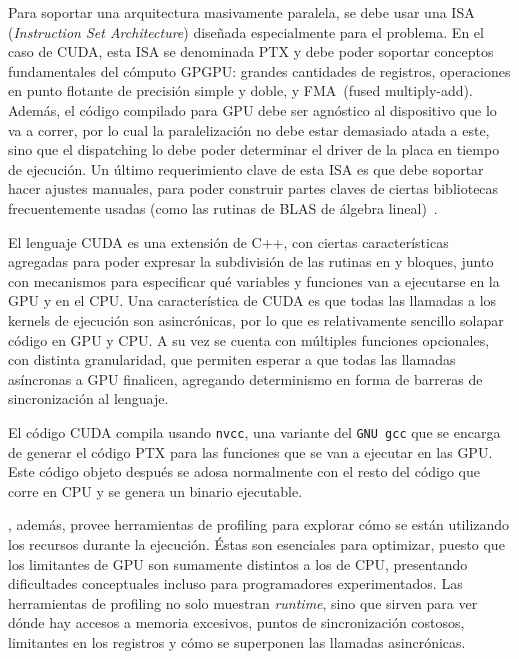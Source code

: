 Para soportar una arquitectura masivamente paralela, se debe usar una ISA (\textit{Instruction Set Architecture}) dise\~nada especialmente para el problema.
En el caso de CUDA, esta ISA se denominada PTX y debe poder soportar conceptos fundamentales del c\'omputo GPGPU: grandes cantidades de registros, operaciones en punto flotante de precisi\'on simple y doble, y FMA~(fused multiply-add).
Adem\'as, el c\'odigo compilado para GPU debe ser agn\'ostico al dispositivo que lo va a correr, por lo cual la paralelizaci\'on no debe estar demasiado atada a este, sino que el dispatching lo debe poder determinar el driver de la placa en tiempo de ejecuci\'on.
Un \'ultimo requerimiento clave de esta ISA es que debe soportar hacer ajustes manuales, para poder construir partes claves de ciertas bibliotecas frecuentemente usadas (como las
rutinas de BLAS de \'algebra lineal)~\cite{NvidiaFermi}.

El lenguaje CUDA es una extensi\'on de C++, con ciertas caracter\'isticas agregadas para poder expresar la subdivisi\'on de las rutinas en \threads{} y bloques, junto con mecanismos para especificar qu\'e variables y funciones van a ejecutarse en la GPU y en el CPU.
Una caracter\'istica de CUDA es que todas las llamadas a los kernels de ejecuci\'on son asincr\'onicas, por lo que es relativamente sencillo solapar c\'odigo en GPU y CPU.
A su vez se cuenta con m\'ultiples funciones opcionales, con distinta granularidad, que permiten esperar a que todas las llamadas as\'incronas a GPU finalicen, agregando determinismo
en forma de barreras de sincronizaci\'on al lenguaje.

El c\'odigo CUDA compila usando \texttt{nvcc}, una variante del \texttt{GNU gcc} que se encarga de generar el c\'odigo PTX para las funciones que se van a ejecutar en las GPU.
Este c\'odigo objeto despu\'es se adosa normalmente con el resto del c\'odigo que corre en CPU y se genera un binario ejecutable.

\nvidia{}, adem\'as, provee herramientas de profiling para explorar c\'omo se est\'an utilizando los recursos durante la ejecuci\'on.
\'Estas son esenciales para optimizar, puesto que los limitantes de GPU son sumamente distintos a los de CPU, presentando dificultades conceptuales incluso para programadores experimentados.
Las herramientas de profiling no solo muestran \emph{runtime}, sino que sirven para ver d\'onde hay accesos a memoria excesivos, puntos de sincronizaci\'on costosos, limitantes en los registros y c\'omo se superponen las llamadas asincr\'onicas.

